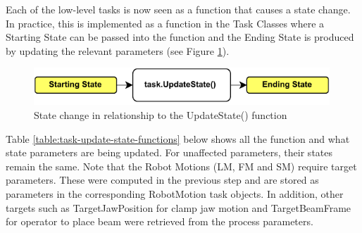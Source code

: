 Each of the low-level tasks is now seen as a function that causes a state change. In practice, this is implemented as a function in the Task Classes where a Starting State can be passed into the function and the Ending State is produced by updating the relevant parameters (see Figure \ref{fig:state-change-function}).

\begin{figure}[!h]
    \centering
    \includegraphics[width=0.99\textwidth]{images/6a/updatestate.pdf}
    \caption{State change in relationship to the UpdateState() function}
    \label{fig:state-change-function}
\end{figure}


Table \ref{table:task-update-state-functions} below shows all the  function and what state parameters are being updated. For unaffected parameters, their states remain the same. Note that the Robot Motions (LM, FM and SM) require target parameters. These were computed in the previous step and are stored as parameters in the corresponding RobotMotion task objects. In addition, other targets such as TargetJawPosition for clamp jaw motion and TargetBeamFrame for operator to place beam were retrieved from the process parameters.

